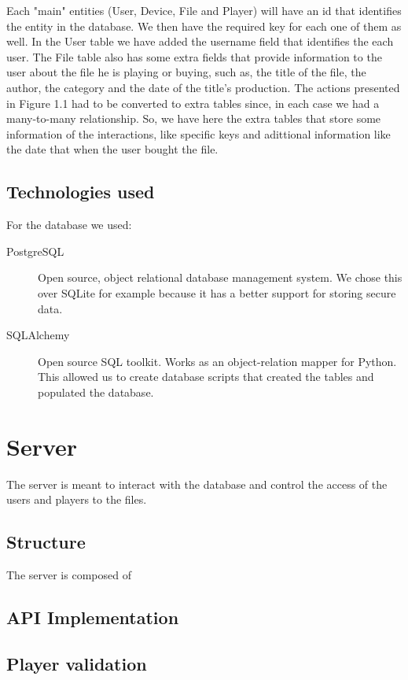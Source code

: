\documentclass[11pt,a4paper]{report}
\begin{document}
Each "main" entities (User, Device, File and Player) will have an id that identifies the entity in the database.
We then have the required key for each one of them as well.
\newline In the User table we have added the username field that identifies the each user.
\newline The File table also has some extra fields that provide information to the user about the file he is playing or buying, such as, the title of the file, the author, the category and the date of the title's production.
\newline The actions presented in Figure 1.1 had to be converted to extra tables since, in each case we had a many-to-many relationship. So, we have here the extra tables that store some information of the interactions, like specific keys and adittional information like the date that when the user bought the file. 

\subsection{Technologies used}
For the database we used:
\begin{description}
  \item[PostgreSQL] Open source, object relational database management system. We chose this over SQLite for example because it has a better support for storing secure data.
  \item[SQLAlchemy] Open source SQL toolkit. Works as an object-relation mapper for Python. This allowed us to create database scripts that created the tables and populated the database.
\end{description}

\section{Server}
The server is meant to interact with the database and control the access of the users and players to the files.

\subsection{Structure}
The server is composed of 
\subsection{API Implementation}
\subsection{Player validation}
\end{document}
